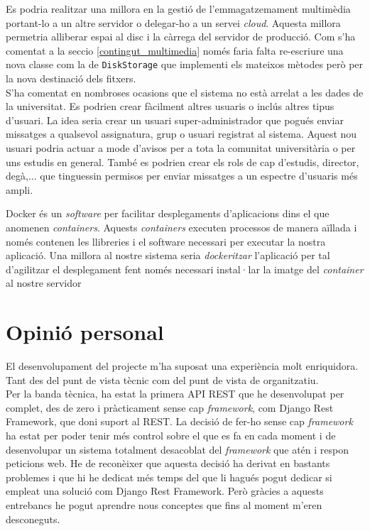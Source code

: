 Es podria realitzar una millora en la gestió de  l'emmagatzemament multimèdia portant-lo a un altre servidor o delegar-ho a un servei   \emph{cloud}. Aquesta millora permetria alliberar espai al disc i la càrrega del servidor de producció. Com s'ha comentat a la seccio \ref{contingut_multimedia} només faria falta re-escriure una nova classe com la de \texttt{DiskStorage} que implementi els mateixos mètodes però per la nova destinació dels fitxers.\\

S'ha comentat en nombroses ocasions que el sistema no està arrelat a les dades de la universitat. Es podrien crear fàcilment altres usuaris o inclús altres tipus d'usuari. La idea seria crear un usuari super-administrador que pogués enviar missatges a qualsevol assignatura, grup o usuari registrat al sistema. Aquest nou usuari podria actuar a mode d'avisos per a tota la comunitat universitària o per uns estudis en general. També es podrien crear els rols de cap d'estudis, director, degà,... que tinguessin permisos per enviar missatges a un espectre d'usuaris més ampli.

Docker \cite{docker} és un \emph{software} per facilitar desplegaments d'aplicacions dins el que anomenen \emph{containers}. Aquests \emph{containers} executen processos de manera aïllada i només contenen les llibreries i el software necessari per executar la nostra aplicació. Una millora al nostre sistema seria \emph{dockeritzar} l'aplicació per tal d'agilitzar el desplegament fent només necessari instal·lar la imatge del \emph{container} al nostre servidor 


\section{Opinió personal}

El desenvolupament del projecte m'ha suposat una experiència molt enriquidora. Tant des del punt de vista tècnic com del punt de vista de organitzatiu.\\

Per la banda tècnica, ha estat la primera \ac{API} \ac{REST} que he desenvolupat per complet, des de zero i pràcticament sense cap \emph{framework}, com Django Rest Framework\cite{djangorestframework},  que doni suport al \ac{REST}. La decisió de fer-ho sense cap \emph{framework} ha estat per poder tenir més control sobre el que es fa en cada moment i de desenvolupar un sistema totalment desacoblat del \emph{framework} que atén i respon peticions web. He de reconèixer que aquesta decisió ha derivat en bastants problemes i que hi he dedicat més temps del que li hagués pogut dedicar si empleat una solució com Django Rest Framework. Però gràcies a aquests entrebancs he pogut aprendre nous conceptes que fins al moment m'eren desconeguts.\\

